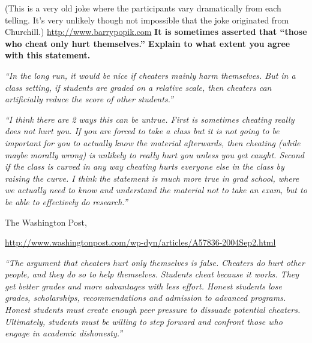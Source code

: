 \documentclass[portrait,11pt]{seminar}
\begin{document}
\medskip

(This is a very old joke where the participants vary dramatically from each telling. It's very unlikely though not impossible that the joke originated from Churchill.) \url{http://www.barrypopik.com}
\es
\bs
{\bf 
It is sometimes asserted that ``those who cheat only hurt themselves.'' Explain to what extent you agree with this statement.
}

\it


{\it ``In the long run, it would be nice if cheaters mainly harm themselves. But in a class setting, if students are graded on a relative scale, then cheaters can artificially reduce the score of other students.''}


\es

\bs
{\it ``I think there are 2 ways this can be untrue. First is sometimes cheating really does not hurt you. If you are forced to take a class but it is not going to be important for you to actually know the material afterwards, then cheating (while maybe morally wrong) is unlikely to really hurt you unless you get caught. Second if the class is curved in any way cheating hurts everyone else in the class by raising the curve. I think the statement is much more true in grad school, where we actually need to know and understand the material not to take an exam, but to be able to effectively do research.''}

\es

\bs

The Washington Post,

\url{http://www.washingtonpost.com/wp-dyn/articles/A57836-2004Sep2.html}

{\it
``The argument that cheaters hurt only themselves is false. Cheaters do hurt other people, and they do so to help themselves. Students cheat because it works. They get better grades and more advantages with less effort. Honest students lose grades, scholarships, recommendations and admission to advanced programs. Honest students must create enough peer pressure to dissuade potential cheaters. Ultimately, students must be willing to step forward and confront those who engage in academic dishonesty.''
}
\end{document}
